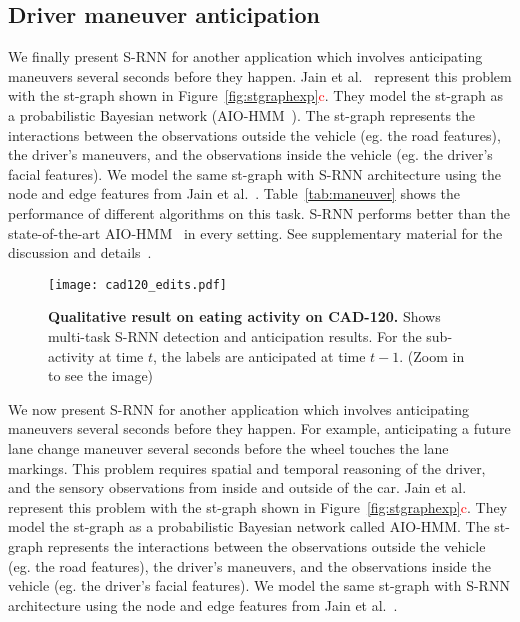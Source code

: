 \documentclass[10pt,twocolumn,letterpaper]{article}
\newcommand{\rc}[1]{\textcolor{red}{#1}}
\begin{document}
\vspace{1\subsectionReduceTop}\subsection{Driver maneuver anticipation}\vspace{1\subsectionReduceBot}
We finally present S-RNN for another application which involves anticipating maneuvers several seconds before they happen.  Jain et al.~\cite{Jain15} represent this problem with the st-graph shown in Figure~\ref{fig:stgraphexp}\rc{c}. They model the st-graph as a probabilistic Bayesian network (AIO-HMM~\citep{Jain15}). The st-graph represents the interactions between the observations outside the vehicle (eg. the road features), the driver's maneuvers, and the observations inside the vehicle (eg. the driver's facial features). We model the same st-graph with S-RNN architecture using the node and edge features from Jain et al.~\cite{Jain15}. Table~\ref{tab:maneuver} shows the performance of different algorithms on this task.  S-RNN performs better than the  state-of-the-art AIO-HMM~\cite{Jain15} in every setting. See supplementary material for the discussion and details~\cite{SuppSRNN}.

\begin{figure}[t]
\centering
\texttt{[image: cad120\_edits.pdf]}
\vspace{1.5\sectionReduceTop}
\caption{\footnotesize{\textbf{Qualitative result on eating activity on CAD-120.} Shows multi-task S-RNN detection and anticipation results. For the sub-activity at time $t$, the labels are anticipated at time $t-1$. (Zoom in to see the image) }}
\vspace{2.7\sectionReduceBot}
\label{fig:eating_anticipation}
\end{figure}\iffalse

We now present S-RNN for another application which involves anticipating maneuvers several seconds before they happen. For example, anticipating a future lane change maneuver several seconds before the wheel touches the lane markings. This problem requires spatial and temporal reasoning of the driver, and the sensory observations from inside and outside of the car. Jain et al.~\cite{Jain15} represent this problem with the st-graph shown in Figure~\ref{fig:stgraphexp}\rc{c}. They model the st-graph as a probabilistic Bayesian network called AIO-HMM. The st-graph represents the interactions between the observations outside the vehicle (eg. the road features), the driver's maneuvers, and the observations inside the vehicle (eg. the driver's facial features). We model the same st-graph with S-RNN architecture using the node and edge features from Jain et al.~\cite{Jain15}.
\end{document}

